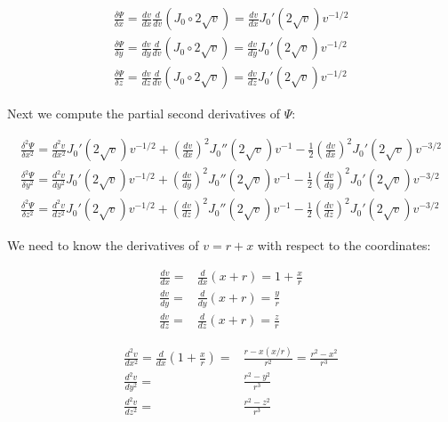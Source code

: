 \documentclass{article}
\begin{document}
\begin{subequations}
\begin{align}
\frac{\delta \Psi}{\delta x} = \frac{d v}{d x} \frac{d}{d v} \left(J_0 \circ 2\sqrt{v}\right) = \frac{d v}{d x} J_0'(2\sqrt{v}) v^{-1/2} \\
\frac{\delta \Psi}{\delta y} = \frac{d v}{d y} \frac{d}{d v} \left(J_0 \circ 2\sqrt{v}\right) = \frac{d v}{d y} J_0'(2\sqrt{v}) v^{-1/2} \\
\frac{\delta \Psi}{\delta z} = \frac{d v}{d z} \frac{d}{d v} \left(J_0 \circ 2\sqrt{v}\right) = \frac{d v}{d z} J_0'(2\sqrt{v}) v^{-1/2}
\end{align}
\end{subequations}

Next we compute the partial second derivatives of $\Psi$:

\begin{subequations}
\label{second partials}
\begin{align}
\frac{\delta^2 \Psi}{\delta x^2} = \frac{d^2 v}{d x^2} J_0'(2\sqrt{v}) v^{-1/2} + \left(\frac{d v}{d x}\right)^2 J_0''(2\sqrt{v}) v^{-1} - \frac{1}{2} \left(\frac{d v}{d x}\right)^2 J_0'(2\sqrt{v}) v^{-3/2} \\
\frac{\delta^2 \Psi}{\delta y^2} = \frac{d^2 v}{d y^2} J_0'(2\sqrt{v}) v^{-1/2} + \left(\frac{d v}{d y}\right)^2 J_0''(2\sqrt{v}) v^{-1} - \frac{1}{2} \left(\frac{d v}{d y}\right)^2 J_0'(2\sqrt{v}) v^{-3/2} \\
\frac{\delta^2 \Psi}{\delta z^2} = \frac{d^2 v}{d z^2} J_0'(2\sqrt{v}) v^{-1/2} + \left(\frac{d v}{d z}\right)^2 J_0''(2\sqrt{v}) v^{-1} - \frac{1}{2} \left(\frac{d v}{d z}\right)^2 J_0'(2\sqrt{v}) v^{-3/2}
\end{align}
\end{subequations}

We need to know the derivatives of $v=r+x$ with respect to the coordinates:

\begin{subequations}
\label{first v}
\begin{align}
\frac{d v}{d x} = & \frac{d}{d x} (x+r) = 1 + \frac{x}{r} \\
\frac{d v}{d y} = & \frac{d}{d y} (x+r) = \frac{y}{r} \\
\frac{d v}{d z} = & \frac{d}{d z} (x+r) = \frac{z}{r}
\end{align}
\end{subequations}

\begin{subequations}
\label{second v}
\begin{align}
\frac{d^2 v}{d x^2} = \frac{d}{d x} \left(1 + \frac{x}{r}\right) = & \frac{r - x(x/r)}{r^2} = \frac{r^2 - x^2}{r^3} \\
\frac{d^2 v}{d y^2} = & \frac{r^2 - y^2}{r^3} \\
\frac{d^2 v}{d z^2} = & \frac{r^2 - z^2}{r^3}
\end{align}
\end{subequations}
\end{document}
